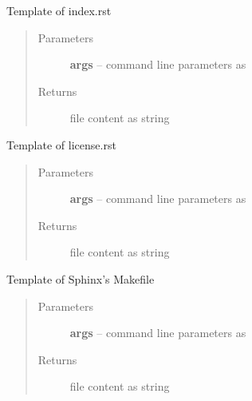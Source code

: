 \documentclass[letterpaper,10pt,english]{sphinxmanual}
\begin{document}

\begin{fulllineitems}
\label{_rst/pyscaffold:pyscaffold.templates.sphinx_index}
Template of index.rst
\begin{quote}\begin{description}
\item[{Parameters}] \leavevmode
\textbf{args} -- command line parameters as \href{http://docs.python.org/2.7/library/argparse.html\#argparse.Namespace}{}

\item[{Returns}] \leavevmode
file content as string

\end{description}\end{quote}

\end{fulllineitems}


\begin{fulllineitems}
\label{_rst/pyscaffold:pyscaffold.templates.sphinx_license}
Template of license.rst
\begin{quote}\begin{description}
\item[{Parameters}] \leavevmode
\textbf{args} -- command line parameters as \href{http://docs.python.org/2.7/library/argparse.html\#argparse.Namespace}{}

\item[{Returns}] \leavevmode
file content as string

\end{description}\end{quote}

\end{fulllineitems}


\begin{fulllineitems}
\label{_rst/pyscaffold:pyscaffold.templates.sphinx_makefile}
Template of Sphinx's Makefile
\begin{quote}\begin{description}
\item[{Parameters}] \leavevmode
\textbf{args} -- command line parameters as \href{http://docs.python.org/2.7/library/argparse.html\#argparse.Namespace}{}

\item[{Returns}] \leavevmode
file content as string

\end{description}\end{quote}

\end{fulllineitems}
\end{document}
